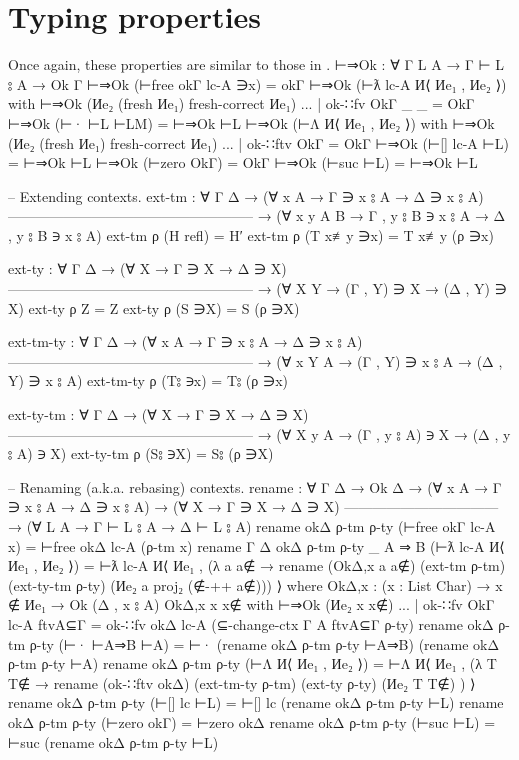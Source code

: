 \documentclass[logo,bsc,singlespacing,parskip,online]{infthesis}
\renewenvironment{code}{\mintedcopy[breaklines,breaksymbolleft=\;]{agda}}{\endmintedcopy}
\begin{document}
\section{Typing properties}
Once again, these properties are similar to those in \citet{wadler_programming_2022}.
\begin{code}
  ⊢⇒Ok : ∀ {Γ L A} → Γ ⊢ L ⦂ A → Ok Γ
  ⊢⇒Ok (⊢free okΓ lc-A ∋x) = okΓ
  ⊢⇒Ok (⊢ƛ lc-A И⟨ Иe₁ , Иe₂ ⟩) with ⊢⇒Ok (Иe₂ (fresh Иe₁) {fresh-correct Иe₁})
  ... | ok-∷fv OkΓ _ _ = OkΓ
  ⊢⇒Ok (⊢· ⊢L ⊢LM) = ⊢⇒Ok ⊢L
  ⊢⇒Ok (⊢Λ И⟨ Иe₁ , Иe₂ ⟩) with ⊢⇒Ok (Иe₂ (fresh Иe₁) {fresh-correct Иe₁})
  ... | ok-∷ftv OkΓ = OkΓ
  ⊢⇒Ok (⊢[] lc-A ⊢L) = ⊢⇒Ok ⊢L
  ⊢⇒Ok (⊢zero OkΓ) = OkΓ
  ⊢⇒Ok (⊢suc ⊢L) = ⊢⇒Ok ⊢L

  -- Extending contexts.
  ext-tm : ∀ {Γ Δ}
    → (∀ {x A}     →        Γ ∋ x ⦂ A → Δ ∋ x ⦂ A)
      -----------------------------------------------------
    → (∀ {x y A B} → Γ , y ⦂ B ∋ x ⦂ A → Δ , y ⦂ B ∋ x ⦂ A)
  ext-tm ρ (H refl) = H′
  ext-tm ρ (T x≢y ∋x) = T x≢y (ρ ∋x)
  
  ext-ty : ∀ {Γ Δ}
    → (∀ {X}     →        Γ ∋ X → Δ ∋ X)
      -----------------------------------------------------
    → (∀ {X Y} → (Γ , Y) ∋ X → (Δ , Y) ∋ X)
  ext-ty ρ Z = Z
  ext-ty ρ (S ∋X) = S (ρ ∋X)

  ext-tm-ty : ∀ {Γ Δ}
    → (∀ {x A}     →        Γ ∋ x ⦂ A → Δ ∋ x ⦂ A)
      -----------------------------------------------------
    → (∀ {x Y A} → (Γ , Y) ∋ x ⦂ A → (Δ , Y) ∋ x ⦂ A)
  ext-tm-ty ρ (T⦂ ∋x) = T⦂ (ρ ∋x)
  
  ext-ty-tm : ∀ {Γ Δ}
    → (∀ {X}     →        Γ ∋ X → Δ ∋ X)
      -----------------------------------------------------
    → (∀ {X y A} → (Γ , y ⦂ A) ∋ X → (Δ , y ⦂ A) ∋ X)
  ext-ty-tm ρ (S⦂ ∋X) = S⦂ (ρ ∋X)

  -- Renaming (a.k.a. rebasing) contexts.
  rename : ∀ {Γ Δ}
    → Ok Δ
    → (∀ {x A} → Γ ∋ x ⦂ A → Δ ∋ x ⦂ A)
    → (∀ {X} → Γ ∋ X → Δ ∋ X)
      ---------------------------------
    → (∀ {L A} → Γ ⊢ L ⦂ A → Δ ⊢ L ⦂ A)
  rename okΔ ρ-tm ρ-ty (⊢free okΓ lc-A x) = ⊢free okΔ lc-A (ρ-tm x)
  rename {Γ} {Δ} okΔ ρ-tm ρ-ty {_} {A ⇒ B} (⊢ƛ lc-A И⟨ Иe₁ , Иe₂ ⟩) =
    ⊢ƛ lc-A И⟨ Иe₁ , (λ a {a∉} →
      rename (OkΔ,x a a∉) (ext-tm ρ-tm) (ext-ty-tm ρ-ty) (Иe₂ a {proj₂ (∉-++ a∉)})) ⟩
    where
      OkΔ,x : (x : List Char) → x ∉ Иe₁ → Ok (Δ , x ⦂ A)
      OkΔ,x x x∉ with ⊢⇒Ok (Иe₂ x {x∉})
      ... | ok-∷fv OkΓ lc-A ftvA⊆Γ = ok-∷fv okΔ lc-A (⊆-change-ctx {Γ} {A} ftvA⊆Γ ρ-ty)
  rename okΔ ρ-tm ρ-ty (⊢· ⊢A⇒B ⊢A) = ⊢· (rename okΔ ρ-tm ρ-ty ⊢A⇒B) (rename okΔ ρ-tm ρ-ty ⊢A)
  rename okΔ ρ-tm ρ-ty (⊢Λ И⟨ Иe₁ , Иe₂ ⟩) =
    ⊢Λ И⟨ Иe₁ , (λ T {T∉} → rename (ok-∷ftv okΔ) (ext-tm-ty ρ-tm) (ext-ty ρ-ty) (Иe₂ T {T∉}) ) ⟩
  rename okΔ ρ-tm ρ-ty (⊢[] lc ⊢L) = ⊢[] lc (rename okΔ ρ-tm ρ-ty ⊢L)
  rename okΔ ρ-tm ρ-ty (⊢zero okΓ) = ⊢zero okΔ
  rename okΔ ρ-tm ρ-ty (⊢suc ⊢L) = ⊢suc (rename okΔ ρ-tm ρ-ty ⊢L)


\end{code}
\end{document}
